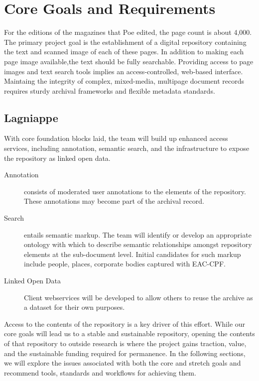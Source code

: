 \section{Core Goals and Requirements}
For the editions of the magazines that Poe edited, the page count is about 4,000. The primary project goal is the establishment of a digital repository containing the text and scanned image of each of these pages. In addition to making each page image available,the text should be fully searchable. Providing access to page images and text search tools implies an access-controlled, web-based interface. Maintaing the integrity of complex, mixed-media, multipage document records requires sturdy archival frameworks and flexible metadata standards. 


\subsection{Lagniappe}
With core foundation blocks laid, the team will build up enhanced access services, including annotation, semantic search, and the infrastructure to expose the repository as linked open data. 
\begin{description}
  \item[Annotation] consists of moderated user annotations to the elements of the repository. These annotations may become part of the archival record.   
  \item[Search] entails semantic markup. The team will identify or develop an appropriate ontology with which to describe semantic relationships amongst repository elements at the sub-document level. Initial candidates for such markup include people, places, corporate bodies captured with EAC-CPF. 
  \item[Linked Open Data] Client webservices will be developed  to allow others to reuse the archive as a dataset for their own purposes. 
\end{description}
Access to the contents of the repository is a key driver of this effort. While our core goals will lead us to a stable and sustainable repository, opening the contents of that repository to outside research is where the project gains traction, value, and the sustainable funding required for permanence. In the following sections, we will explore the issues associated with both the core and stretch goals and recommend tools, standards and workflows for achieving them.